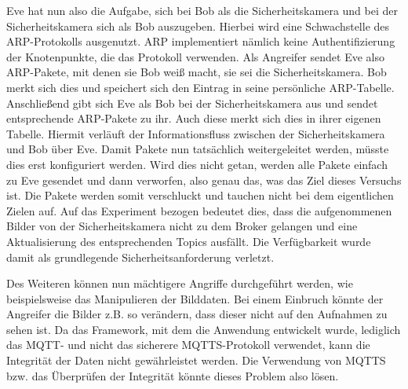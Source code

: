Eve hat nun also die Aufgabe, sich bei Bob als die Sicherheitskamera und bei der
Sicherheitskamera sich als Bob auszugeben. Hierbei wird eine Schwachstelle des
ARP-Protokolls ausgenutzt. ARP implementiert nämlich keine Authentifizierung der
Knotenpunkte, die das Protokoll verwenden. Als Angreifer sendet Eve also
ARP-Pakete, mit denen sie Bob weiß macht, sie sei die Sicherheitskamera. Bob
merkt sich dies und speichert sich den Eintrag in seine persönliche ARP-Tabelle.
Anschließend gibt sich Eve als Bob bei der Sicherheitskamera aus und sendet
entsprechende ARP-Pakete zu ihr. Auch diese merkt sich dies in ihrer eigenen
Tabelle. Hiermit verläuft der Informationsfluss zwischen der Sicherheitskamera
und Bob über Eve. Damit Pakete nun tatsächlich weitergeleitet werden, müsste
dies erst konfiguriert werden. Wird dies nicht getan, werden alle Pakete
einfach zu Eve gesendet und dann verworfen, also genau das, was das
Ziel dieses Versuchs ist. Die Pakete werden somit verschluckt und tauchen nicht
bei dem eigentlichen Zielen auf. Auf das Experiment bezogen bedeutet dies, dass
die aufgenommenen Bilder von der Sicherheitskamera nicht zu dem Broker gelangen
und eine Aktualisierung des entsprechenden Topics ausfällt. Die Verfügbarkeit
wurde damit als grundlegende Sicherheitsanforderung verletzt.

Des Weiteren können nun mächtigere Angriffe durchgeführt werden, wie
beispielsweise das Manipulieren der Bilddaten. Bei einem Einbruch könnte der
Angreifer die Bilder z.B. so verändern, dass dieser nicht auf den Aufnahmen zu
sehen ist. Da das Framework, mit dem die Anwendung entwickelt wurde, lediglich
das MQTT- und nicht das sicherere MQTTS-Protokoll verwendet, kann die Integrität
der Daten nicht gewährleistet werden. Die Verwendung von MQTTS bzw. das
Überprüfen der Integrität könnte dieses Problem also lösen.

